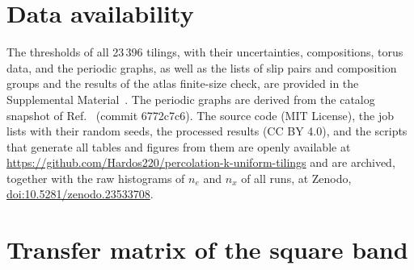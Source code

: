 \documentclass[pre,twocolumn,superscriptaddress,longbibliography,floatfix]{revtex4-2}
\begin{document}
\section*{Data availability}
The thresholds of all 23\,396 tilings, with their uncertainties, compositions, torus data, and the periodic graphs, as well as the lists of slip pairs and composition groups and the results of the atlas finite-size check, are provided in the Supplemental Material~\cite{SM}. The periodic graphs are derived from the catalog snapshot of Ref.~\cite{TesCatalog} (commit 6772c7c6). The source code (MIT License), the job lists with their random seeds, the processed results (CC BY 4.0), and the scripts that generate all tables and figures from them are openly available at \url{https://github.com/Hardos220/percolation-k-uniform-tilings} and are archived, together with the raw histograms of $n_e$ and $n_x$ of all runs, at Zenodo, \href{https://doi.org/10.5281/zenodo.23533708}{doi:10.5281/zenodo.23533708}.

\appendix

\section{Transfer matrix of the square band}\label{app:tm}
\end{document}
